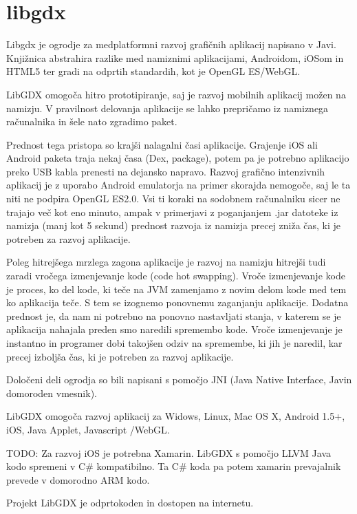 \section{libgdx\cite{libgdx}}

Libgdx je ogrodje za medplatformni razvoj grafičnih aplikacij napisano v Javi. Knjižnica abstrahira razlike med namiznimi aplikacijami, Androidom, iOSom in HTML5 ter gradi na odprtih standardih, kot je OpenGL ES/WebGL.

LibGDX omogoča hitro prototipiranje, saj je razvoj mobilnih aplikacij možen na namizju. V pravilnost delovanja aplikacije se lahko prepričamo iz namiznega računalnika in šele nato zgradimo paket. 

Prednost tega pristopa so krajši nalagalni časi aplikacije. Grajenje iOS ali Android paketa traja nekaj časa (Dex, package), potem pa je potrebno aplikacijo preko USB kabla prenesti na dejansko napravo. Razvoj grafično intenzivnih aplikacij je z uporabo Android emulatorja na primer skorajda nemogoče, saj le ta niti ne podpira OpenGL ES2.0. Vsi ti koraki na sodobnem računalniku sicer ne trajajo več kot eno minuto, ampak v primerjavi z poganjanjem .jar datoteke iz namizja (manj kot 5 sekund) prednost razvoja iz namizja precej zniža čas, ki je potreben za razvoj aplikacije.

Poleg hitrejšega mrzlega zagona aplikacije je razvoj na namizju hitrejši tudi zaradi vročega izmenjevanje kode (code hot swapping). Vroče izmenjevanje kode je proces, ko del kode, ki teče na JVM zamenjamo z novim delom kode med tem ko aplikacija teče. S tem se izognemo ponovnemu zaganjanju aplikacije. Dodatna prednost je, da nam ni potrebno na ponovno nastavljati stanja, v katerem se je aplikacija nahajala preden smo naredili spremembo kode. Vroče izmenjevanje je instantno in programer dobi takojšen odziv na spremembe, ki jih je naredil, kar precej izboljša čas, ki je potreben za razvoj aplikacije.

Določeni deli ogrodja so bili napisani s pomočjo JNI (Java Native Interface, Javin domoroden vmesnik).

LibGDX omogoča razvoj aplikacij za Widows, Linux, Mac OS X, Android 1.5+, iOS, Java Applet, Javascript /WebGL. 

TODO: Za razvoj iOS je potrebna Xamarin. LibGDX s pomočjo LLVM Java kodo spremeni v C\# kompatibilno. Ta C\# koda pa potem xamarin prevajalnik prevede v domorodno ARM kodo.

Projekt LibGDX je odprtokoden in dostopen na internetu.

